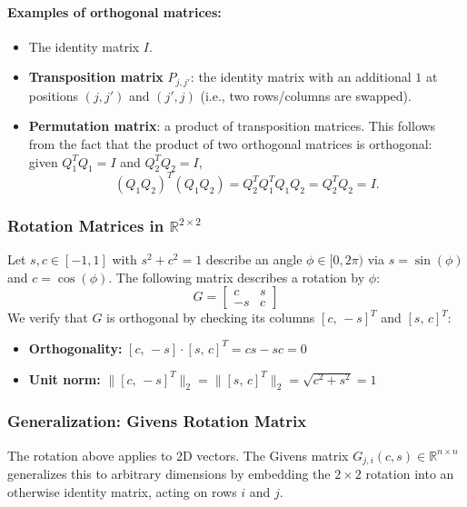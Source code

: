 \documentclass{article}
\begin{document}
\paragraph{Examples of orthogonal matrices:}
\begin{itemize}
  \item The identity matrix $I$.

  \item \textbf{Transposition matrix} $P_{j,j'}$: the identity matrix with an additional $1$ at positions $(j,j')$ and $(j',j)$ (i.e., two rows/columns are swapped).

  \item \textbf{Permutation matrix}: a product of transposition matrices. This follows from the fact that the product of two orthogonal matrices is orthogonal: given $Q_1^TQ_1 = I$ and $Q_2^TQ_2 = I$,
  \[
  (Q_1Q_2)^T(Q_1Q_2) = Q_2^TQ_1^TQ_1Q_2 = Q_2^TQ_2 = I.
  \]
\end{itemize}

\subsubsection{Rotation Matrices in $\mathbb{R}^{2\times 2}$}
Let $s, c \in [-1,1]$ with $s^2 + c^2 = 1$ describe an angle $\phi \in [0,2\pi)$ via $s = \sin(\phi)$ and $c = \cos(\phi)$. The following matrix describes a rotation by $\phi$:
\[
G =
\begin{bmatrix}
  c  & s \\
  -s & c
\end{bmatrix}
\]
We verify that $G$ is orthogonal by checking its columns $[c,\,-s]^T$ and $[s,\,c]^T$:
\begin{itemize}
  \item \textbf{Orthogonality:} $[c,\,-s]\cdot[s,\,c]^T = cs - sc = 0$ \checkmark
  \item \textbf{Unit norm:} $\|[c,\,-s]^T\|_2 = \|[s,\,c]^T\|_2 = \sqrt{c^2+s^2} = 1$ \checkmark
\end{itemize}

\subsubsection{Generalization: Givens Rotation Matrix}
\label{sec:givens}
The rotation above applies to 2D vectors. The Givens matrix $G_{j,i}(c,s) \in \mathbb{R}^{n\times n}$ generalizes this to arbitrary dimensions by embedding the $2\times 2$ rotation into an otherwise identity matrix, acting on rows $i$ and $j$.
\end{document}
